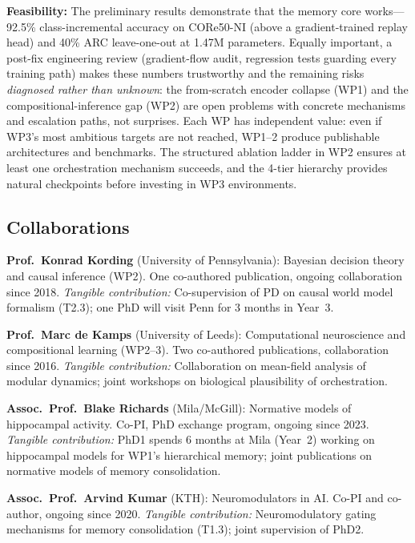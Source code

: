 \noindent\textbf{Feasibility:} The preliminary results demonstrate that the memory core works---92.5\% class-incremental accuracy on CORe50-NI (above a gradient-trained replay head) and 40\% ARC leave-one-out at 1.47M parameters. Equally important, a post-fix engineering review (gradient-flow audit, regression tests guarding every training path) makes these numbers trustworthy and the remaining risks \textit{diagnosed rather than unknown}: the from-scratch encoder collapse (WP1) and the compositional-inference gap (WP2) are open problems with concrete mechanisms and escalation paths, not surprises. Each WP has independent value: even if WP3's most ambitious targets are not reached, WP1--2 produce publishable architectures and benchmarks. The structured ablation ladder in WP2 ensures at least one orchestration mechanism succeeds, and the 4-tier hierarchy provides natural checkpoints before investing in WP3 environments.

\subsection{Collaborations}

\noindent\textbf{Prof.\ Konrad Kording} (University of Pennsylvania): Bayesian decision theory and causal inference (WP2). One co-authored publication, ongoing collaboration since 2018. \textit{Tangible contribution:} Co-supervision of PD on causal world model formalism (T2.3); one PhD will visit Penn for 3 months in Year~3.

\noindent\textbf{Prof.\ Marc de Kamps} (University of Leeds): Computational neuroscience and compositional learning (WP2--3). Two co-authored publications, collaboration since 2016. \textit{Tangible contribution:} Collaboration on mean-field analysis of modular dynamics; joint workshops on biological plausibility of orchestration.

\noindent\textbf{Assoc.\ Prof.\ Blake Richards} (Mila/McGill): Normative models of hippocampal activity. Co-PI, PhD exchange program, ongoing since 2023. \textit{Tangible contribution:} PhD1 spends 6 months at Mila (Year~2) working on hippocampal models for WP1's hierarchical memory; joint publications on normative models of memory consolidation.

\noindent\textbf{Assoc.\ Prof.\ Arvind Kumar} (KTH): Neuromodulators in AI. Co-PI and co-author, ongoing since 2020. \textit{Tangible contribution:} Neuromodulatory gating mechanisms for memory consolidation (T1.3); joint supervision of PhD2.


